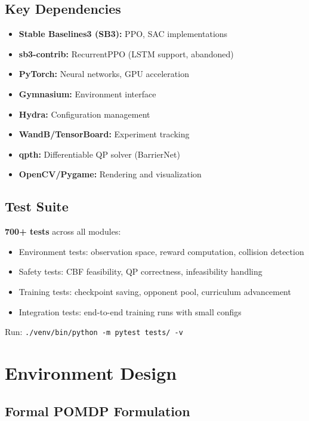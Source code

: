 \documentclass[11pt,a4paper]{report}
\begin{document}
\section{Key Dependencies}

\begin{itemize}
    \item \textbf{Stable Baselines3 (SB3):} PPO, SAC implementations
    \item \textbf{sb3-contrib:} RecurrentPPO (LSTM support, abandoned)
    \item \textbf{PyTorch:} Neural networks, GPU acceleration
    \item \textbf{Gymnasium:} Environment interface
    \item \textbf{Hydra:} Configuration management
    \item \textbf{WandB/TensorBoard:} Experiment tracking
    \item \textbf{qpth:} Differentiable QP solver (BarrierNet)
    \item \textbf{OpenCV/Pygame:} Rendering and visualization
\end{itemize}

\section{Test Suite}

\textbf{700+ tests} across all modules:
\begin{itemize}
    \item Environment tests: observation space, reward computation, collision detection
    \item Safety tests: CBF feasibility, QP correctness, infeasibility handling
    \item Training tests: checkpoint saving, opponent pool, curriculum advancement
    \item Integration tests: end-to-end training runs with small configs
\end{itemize}

Run: \texttt{./venv/bin/python -m pytest tests/ -v}

\chapter{Environment Design}
\label{chap:env}

\section{Formal POMDP Formulation}
\end{document}
